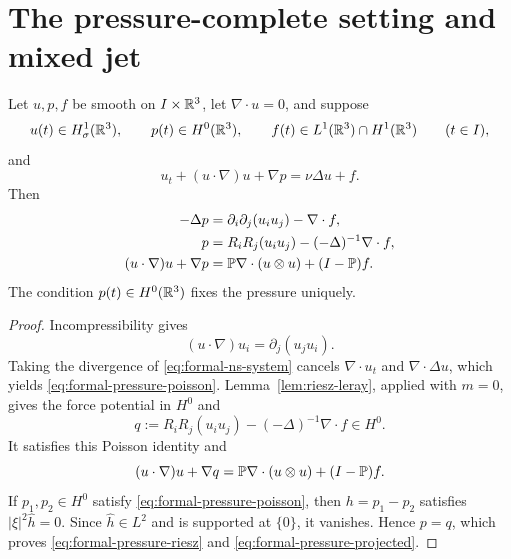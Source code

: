 \section{The pressure-complete setting and mixed jet}
\label{sec:formal-setting-mixed-jet}

\begin{proposition}
\label{prop:formal-pressure-normalization}
Let \(u,p,f\) be smooth on \(I\times\mathbb R^3\), let \(\nabla\cdot u=0\), and suppose
\[
 u(t)\in H^1_\sigma(\mathbb R^3),
 \qquad
 p(t)\in H^0(\mathbb R^3),
 \qquad f(t)\in L^1(\mathbb R^3)\cap H^1(\mathbb R^3)
 \qquad(t\in I),
\]
and
\begin{equation}
 u_t+(u\cdot\nabla)u+\nabla p=\nu\Delta u+f.
 \label{eq:formal-ns-system}
\end{equation}
Then
\begin{align}
 -\Delta p
 &=\partial_i\partial_j(u_i u_j)-\nabla\cdot f,
 \label{eq:formal-pressure-poisson}\\
 p
 &=R_iR_j(u_i u_j)-(-\Delta)^{-1}\nabla\cdot f,
 \label{eq:formal-pressure-riesz}\\
 (u\cdot\nabla)u+\nabla p
 &=\mathbb P\nabla\cdot(u\otimes u)+(I-\mathbb P)f.
 \label{eq:formal-pressure-projected}
\end{align}
The condition \(p(t)\in H^0(\mathbb R^3)\) fixes the pressure uniquely.
\end{proposition}

\begin{proof}
Incompressibility gives
\[
 (u\cdot\nabla)u_i=\partial_j(u_j u_i).
\]
Taking the divergence of \eqref{eq:formal-ns-system} cancels
\(\nabla\cdot u_t\) and \(\nabla\cdot\Delta u\), which yields
\eqref{eq:formal-pressure-poisson}.  Lemma~\ref{lem:riesz-leray}, applied
with \(m=0\), gives the force potential in \(H^0\) and
\[
 q:=R_iR_j(u_i u_j)-(-\Delta)^{-1}\nabla\cdot f\in H^0.
\]
It satisfies this Poisson identity and
\[
 (u\cdot\nabla)u+\nabla q
 =\mathbb P\nabla\cdot(u\otimes u)+(I-\mathbb P)f.
\]
If \(p_1,p_2\in H^0\) satisfy \eqref{eq:formal-pressure-poisson}, then
\(h=p_1-p_2\) satisfies
\(|\xi|^2\widehat h=0\).  Since \(\widehat h\in L^2\) and is supported at
\(\{0\}\), it vanishes.  Hence \(p=q\), which proves
\eqref{eq:formal-pressure-riesz} and \eqref{eq:formal-pressure-projected}.
\end{proof}

